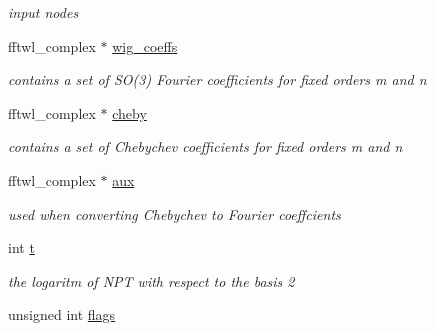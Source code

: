 \begin{DoxyCompactItemize}
\begin{DoxyCompactList}\small\item\em input nodes \end{DoxyCompactList}\item 
\hypertarget{structnfsoftl__plan___a452e16848e81fd0b072d4e3347345455}{fftwl\-\_\-complex $\ast$ \hyperlink{structnfsoftl__plan___a452e16848e81fd0b072d4e3347345455}{wig\-\_\-coeffs}}\label{structnfsoftl__plan___a452e16848e81fd0b072d4e3347345455}

\begin{DoxyCompactList}\small\item\em contains a set of S\-O(3) Fourier coefficients for fixed orders m and n \end{DoxyCompactList}\item 
\hypertarget{structnfsoftl__plan___a681110b5c15effe7ef2781249e049119}{fftwl\-\_\-complex $\ast$ \hyperlink{structnfsoftl__plan___a681110b5c15effe7ef2781249e049119}{cheby}}\label{structnfsoftl__plan___a681110b5c15effe7ef2781249e049119}

\begin{DoxyCompactList}\small\item\em contains a set of Chebychev coefficients for fixed orders m and n \end{DoxyCompactList}\item 
\hypertarget{structnfsoftl__plan___ae669348fbbb187c8c521f6a89c8f3720}{fftwl\-\_\-complex $\ast$ \hyperlink{structnfsoftl__plan___ae669348fbbb187c8c521f6a89c8f3720}{aux}}\label{structnfsoftl__plan___ae669348fbbb187c8c521f6a89c8f3720}

\begin{DoxyCompactList}\small\item\em used when converting Chebychev to Fourier coeffcients \end{DoxyCompactList}\item 
\hypertarget{structnfsoftl__plan___acd18e8a2b89aacd8034b49033449f979}{int \hyperlink{structnfsoftl__plan___acd18e8a2b89aacd8034b49033449f979}{t}}\label{structnfsoftl__plan___acd18e8a2b89aacd8034b49033449f979}

\begin{DoxyCompactList}\small\item\em the logaritm of N\-P\-T with respect to the basis 2 \end{DoxyCompactList}\item 
\hypertarget{structnfsoftl__plan___a2f236235168535b9f9833bcc7e50e695}{unsigned int \hyperlink{structnfsoftl__plan___a2f236235168535b9f9833bcc7e50e695}{flags}}\label{structnfsoftl__plan___a2f236235168535b9f9833bcc7e50e695}


\end{DoxyCompactItemize}
